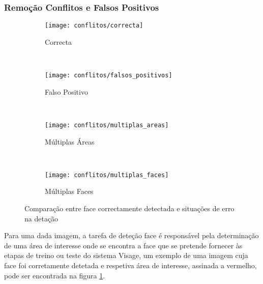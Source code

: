 \subsubsection*{Remoção Conflitos e Falsos Positivos}

\begin{figure}[t]
        \centering
        \begin{subfigure}[b]{0.2\textwidth}
                \centering
                \texttt{[image: conflitos/correcta]}
                \caption{Correcta}
                \label{fig:conflitos-correcta}
        \end{subfigure}%
        ~ 
        \begin{subfigure}[b]{0.2\textwidth}
                \centering
                \texttt{[image: conflitos/falsos\_positivos]}
                \caption{Falso Positivo}
                \label{fig:conflitos-falsos_positivos}
        \end{subfigure}
        ~ 
        \begin{subfigure}[b]{0.2\textwidth}
                \centering
                \texttt{[image: conflitos/multiplas\_areas]}
                \caption{Múltiplas Áreas}
                \label{fig:conflitos-multiplas_areas}
        \end{subfigure}
        ~ 
        \begin{subfigure}[b]{0.2\textwidth}
                \centering
                \texttt{[image: conflitos/multiplas\_faces]}
                \caption{Múltiplas Faces}
                \label{fig:conflitos-multiplas_faces}
        \end{subfigure}
        \caption{Comparação entre face correctamente detectada e situações de erro na detação}\label{fig:conflitos-detecao}
\end{figure}

Para uma dada imagem, a tarefa de deteção face é responsável pela determinação de uma área de interesse onde se encontra a face que se pretende fornecer às etapas de treino ou teste do sistema Visage, um exemplo de uma imagem cuja face foi corretamente detetada e respetiva área de interesse, assinada a vermelho, pode ser encontrada na figura \ref{fig:conflitos-correcta}.

